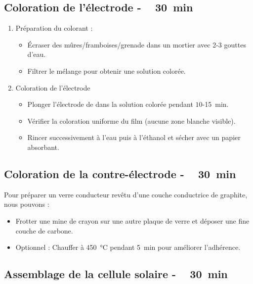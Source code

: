 \documentclass[twoside,a4paper,11pt,addpoints,answers]{exam}%
\begin{document}
\subsection{Coloration de l’électrode - \faClockO ~ \SI{30}{\minute}}

\begin{enumerate}
\item Préparation du colorant :
\begin{itemize}
\item Écraser des mûres/framboises/grenade dans un mortier avec 2-3 gouttes d’eau.
\item Filtrer le mélange pour obtenir une solution colorée.
\end{itemize}

\item Coloration de l'électrode
\begin{itemize}
\item Plonger l’électrode de  dans la solution colorée pendant $10$-\SI{15}{\minute}.
\item Vérifier la coloration uniforme du film (aucune zone blanche visible).
\item Rincer successivement à l’eau puis à l’éthanol et sécher avec un papier absorbant.
\end{itemize}

\end{enumerate}

\subsection{Coloration de la contre-électrode - \faClockO ~ \SI{30}{\minute}}
Pour préparer un verre conducteur revêtu d'une couche conductrice de graphite, nous pouvons : 
\begin{itemize}
\item Frotter une mine de crayon sur une autre plaque de verre et déposer une fine couche de carbone.
\item Optionnel : Chauffer à \SI{450}{\celsius} pendant \SI{5}{\minute} pour améliorer l’adhérence.
\end{itemize}


\subsection{Assemblage de la cellule solaire - \faClockO ~ \SI{30}{\minute}}
\end{document}

